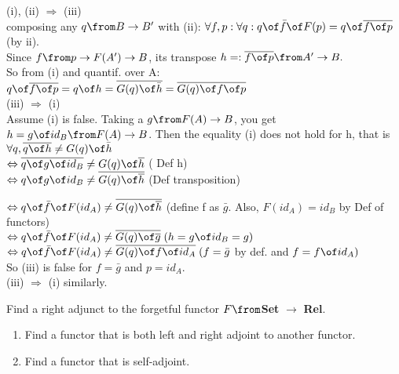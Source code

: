 \begin{answer}
(i), (ii) $\Rightarrow$ (iii)\\
composing any $q \from B \to B'$ with (ii): $\forall f, p: \forall q: q \of \bar{f} \of F(p) = q \of \overline{f \of p} $ (by ii). \\Since $f \from p \to F(A') \to B$, its transpose $h=:\overline{f \of p} \from A' \to B.$ \\So from (i) and quantif. over A: $q \of \overline{f \of p}  = q \of h = \overline{G(q) \of \bar{h}} = \overline{G(q) \of f \of p}$\\
(iii) $\Rightarrow$ (i)\\
Assume (i) is false.
Taking a $g \from F(A) \to B$, you get $h = g  \of id_B  \from F(A) \to B$.
Then the equality (i) does not hold for h, that is \\
$\forall q, \overline{q \of h} \not= G(q) \of \bar{h}$
\\$ \Leftrightarrow \overline{q \of g  \of id_B} \not= G(q)  \of \overline{h}$ ( Def h)\\
$\Leftrightarrow q \of g  \of id_B \not= \overline{G(q)  \of \overline{h}}$ (Def transposition)

$\Leftrightarrow q \of \bar{f}  \of F(id_A) \not= \overline{G(q)  \of \overline{h}} $  (define f as $\bar {g}.$ Also, $  F(id_A) = id_B$ by Def of functors)
\\$\Leftrightarrow q \of \bar{f}  \of F(id_A) \not= \overline{G(q)  \of \overline{g}} \; (h = g \of id_B = g)$
\\$\Leftrightarrow q \of \bar{f}  \of F(id_A) \not= \overline{G(q)  \of f \of id_A}\;  (f = \bar{g} $ by def. and $f = f \of id_A)$
\\So (iii) is false for $f = \bar {g}$ and $ p= id_A$. \\(iii)  $\Rightarrow$ (i) similarly.
\end{answer}


\begin{exercise}
Find a right adjunct to the forgetful functor $F \from $\textbf{Set }$ \to $\textbf{ Rel}.
\end{exercise}
\begin{answer}
\end{answer}


\begin{exercise}
\begin{enumerate}
\item Find a functor that is both left and right adjoint to another functor.
\item Find a functor that is self-adjoint.
\end{enumerate}
\end{exercise}

